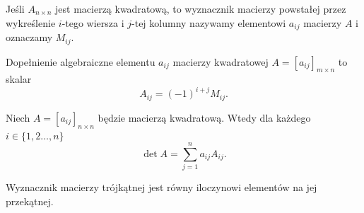Jeśli $A_{n\times n}$ jest macierzą kwadratową, to wyznacznik macierzy powstałej przez wykreślenie $i$-tego wiersza i $j$-tej kolumny nazywamy  elementowi $a_{ij}$ macierzy $A$ i oznaczamy $M_{ij}$.

\begin{definition}
    Dopełnienie algebraiczne elementu $a_{ij}$ macierzy kwadratowej $A = [a_{ij}]_{m\times n}$ to skalar
    \[ A_{ij} = (-1)^{i+j}M_{ij}. \]
\end{definition}

\begin{theorem}[Laplace'a]
    \label{t:Laplace}
    Niech $A = [a_{ij}]_{n\times n}$ będzie macierzą kwadratową. Wtedy dla każdego $i \in \{1,2\ldots,n\}$ 
    \[ \det A = \sum_{j=1}^n a_{ij}A_{ij}. \]
\end{theorem}

\begin{corollary}
    \label{c:determinant in triangular matrix}
    Wyznacznik macierzy trójkątnej jest równy iloczynowi elementów na jej przekątnej.
\end{corollary}